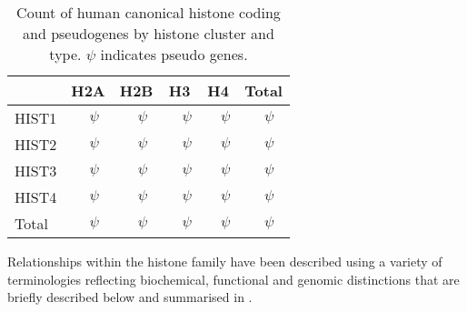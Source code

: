 \begin{table*}[hp]
	\caption{
	Count of human canonical histone coding and pseudogenes by histone cluster and type.
	$\psi$ indicates pseudo genes.}
	\label{tab:histone-gene-count}
	\centering
	\begin{tabular}{l r@{ + }l<{$\psi$} r@{ + }l<{$\psi$} r@{ + }l<{$\psi$} r@{ + }l<{$\psi$} r@{ + }l<{$\psi$}}
		\toprule
		\null   & \multicolumn{2}{c}{H2A}  & \multicolumn{2}{c}{H2B}
			& \multicolumn{2}{c}{H3}   & \multicolumn{2}{c}{H4}
			& \multicolumn{2}{c}{Total} \\
		\midrule
		HIST1   & \HTwoACodingInHISTOne{}     & \HTwoAPseudoInHISTOne{}
			& \HTwoBCodingInHISTOne{}     & \HTwoBPseudoInHISTOne{}
			& \HThreeCodingInHISTOne{}    & \HThreePseudoInHISTOne{}
			& \HFourCodingInHISTOne{}     & \HFourPseudoInHISTOne{}
			& \CodingGenesInHISTOne{}     & \PseudoGenesInHISTOne{} \\
		HIST2   & \HTwoACodingInHISTTwo{}     & \HTwoAPseudoInHISTTwo{}
			& \HTwoBCodingInHISTTwo{}     & \HTwoBPseudoInHISTTwo{}
			& \HThreeCodingInHISTTwo{}    & \HThreePseudoInHISTTwo{}
			& \HFourCodingInHISTTwo{}     & \HFourPseudoInHISTTwo{}
			& \CodingGenesInHISTTwo{}     & \PseudoGenesInHISTTwo{} \\
		HIST3   & \HTwoACodingInHISTThree{}   & \HTwoAPseudoInHISTThree{}
			& \HTwoBCodingInHISTThree{}   & \HTwoBPseudoInHISTThree{}
			& \HThreeCodingInHISTThree{}  & \HThreePseudoInHISTThree{}
			& \HFourCodingInHISTThree{}   & \HFourPseudoInHISTThree{}
			& \CodingGenesInHISTThree{}   & \PseudoGenesInHISTThree{} \\
		HIST4   & \HTwoACodingInHISTFour{}    & \HTwoAPseudoInHISTFour{}
			& \HTwoBCodingInHISTFour{}    & \HTwoBPseudoInHISTFour{}
			& \HThreeCodingInHISTFour{}   & \HThreePseudoInHISTFour{}
			& \HFourCodingInHISTFour{}    & \HFourPseudoInHISTFour{}
			& \CodingGenesInHISTFour{}  & \PseudoGenesInHISTFour{} \\
		\addlinespace
		Total   & \HTwoACodingGenes{}       & \HTwoAPseudoGenes{}
			& \HTwoBCodingGenes{}       & \HTwoBPseudoGenes{}
			& \HThreeCodingGenes{}      & \HThreePseudoGenes{}
			& \HFourCodingGenes{}       & \HFourPseudoGenes{}
			& \TotalCodingGenes{}       & \TotalPseudoGenes{} \\
		\bottomrule
	\end{tabular}
\end{table*}

	Relationships within the histone family have been described using a variety of terminologies
	reflecting biochemical, functional and genomic distinctions that are briefly described below 
	and summarised in .

